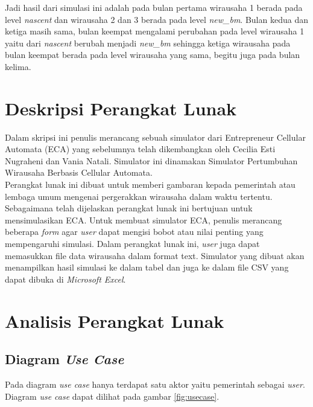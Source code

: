 Jadi hasil dari simulasi ini adalah pada bulan pertama wirausaha 1 berada pada level \textit{nascent} dan wirausaha 2 dan 3 berada pada level \textit{new\_bm}. Bulan kedua dan ketiga masih sama, bulan keempat mengalami perubahan pada level wirausaha 1 yaitu dari \textit{nascent} berubah menjadi \textit{new\_bm} sehingga ketiga wirausaha pada bulan keempat berada pada level wirausaha yang sama, begitu juga pada bulan kelima.
	
\section{Deskripsi Perangkat Lunak}
\label{dpl}

Dalam skripsi ini penulis merancang sebuah simulator dari Entrepreneur Cellular Automata (ECA) yang sebelumnya telah dikembangkan oleh Cecilia Esti Nugraheni dan Vania Natali. Simulator ini dinamakan Simulator Pertumbuhan Wirausaha Berbasis Cellular Automata.\\
Perangkat lunak ini dibuat untuk memberi gambaran kepada pemerintah atau lembaga umum mengenai pergerakkan wirausaha dalam waktu tertentu. Sebagaimana telah dijelaskan perangkat lunak ini bertujuan untuk mensimulasikan ECA. Untuk membuat simulator ECA, penulis merancang beberapa \textit{form} agar \textit{user} dapat mengisi bobot atau nilai penting yang mempengaruhi simulasi. Dalam perangkat lunak ini, \textit{user} juga dapat memasukkan file data wirausaha dalam format text. Simulator yang dibuat akan menampilkan hasil simulasi ke dalam tabel dan juga ke dalam file CSV yang dapat dibuka di \textit{Microsoft Excel}.


\section{Analisis Perangkat Lunak}
\label{analisisPL}

\subsection{Diagram \textit{Use Case}}

Pada diagram \textit{use case} hanya terdapat satu aktor yaitu pemerintah sebagai \textit{user}. Diagram \textit{use case} dapat dilihat pada gambar \ref{fig:usecase}.

